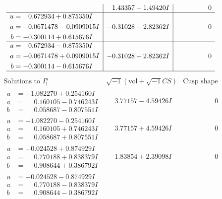 \documentclass[1p]{elsarticle_modified}
\theoremstyle{definition}
\newcommand{\I}{\sqrt{-1}}
\begin{document}
$$\begin{array}{c|c|c}
 & \phantom{-}1.43357 - 1.49420 I & \phantom{-0.000000 } 0 \\ \hline\begin{aligned}
u &= \phantom{-}0.672934 + 0.875350 I \\
a &= -0.0671478 - 0.0909015 I \\
b &= -0.300114 + 0.615676 I\end{aligned}
 & -0.31028 + 2.82362 I & \phantom{-0.000000 } 0 \\ \hline\begin{aligned}
u &= \phantom{-}0.672934 - 0.875350 I \\
a &= -0.0671478 + 0.0909015 I \\
b &= -0.300114 - 0.615676 I\end{aligned}
 & -0.31028 - 2.82362 I & \phantom{-0.000000 } 0\\
 \hline 
 \end{array}$$\newpage$$\begin{array}{c|c|c}  
\text{Solutions to }I^u_{1}& \I (\text{vol} + \sqrt{-1}CS) & \text{Cusp shape}\\
 \hline 
\begin{aligned}
u &= -1.082270 + 0.254160 I \\
a &= \phantom{-}0.160105 - 0.746243 I \\
b &= \phantom{-}0.058687 - 0.807551 I\end{aligned}
 & \phantom{-}3.77157 - 4.59426 I & \phantom{-0.000000 } 0 \\ \hline\begin{aligned}
u &= -1.082270 - 0.254160 I \\
a &= \phantom{-}0.160105 + 0.746243 I \\
b &= \phantom{-}0.058687 + 0.807551 I\end{aligned}
 & \phantom{-}3.77157 + 4.59426 I & \phantom{-0.000000 } 0 \\ \hline\begin{aligned}
u &= -0.024528 + 0.874929 I \\
a &= \phantom{-}0.770188 + 0.838379 I \\
b &= \phantom{-}0.908644 + 0.386792 I\end{aligned}
 & \phantom{-}1.83854 + 2.39098 I & \phantom{-0.000000 } 0 \\ \hline\begin{aligned}
u &= -0.024528 - 0.874929 I \\
a &= \phantom{-}0.770188 - 0.838379 I \\
b &= \phantom{-}0.908644 - 0.386792 I\end{aligned}

\end{array}$$
\end{document}
